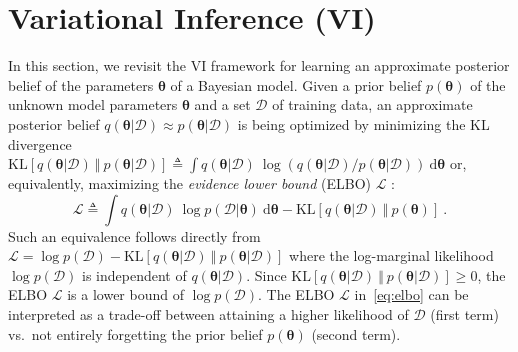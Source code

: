 \documentclass{article}
\theoremstyle{definition}
\newcommand{\todo}[1]{}
\newcommand{\mcl}[1]{\mathcal{#1}}
\newcommand{\da}{\mcl{D}}
\begin{document}
%
\todo{Question: are there a technique for doing unlearning for variational methods}
%
\todo{challenge: the approximate posterior. So to recover the exact unlearned model/posterior/belief is challenging}
%
\todo{a trade-off between unlearning and the predictive performance}
%
\todo{our contributions: upper bound for unlearning (easy for exact Bayesian learning but not interesting), when posterior is approximate, we present a modified likelihood that allows trade-off between unlearning quality and predictive performance}
%
\todo{quickly unlearning, and continue to optimize the posterior slowly}
%
\section{Variational Inference (VI)}
\label{sec:vi}%
%
In this section, we revisit the VI framework \cite{blei2017variational} for learning an approximate posterior belief of the parameters $\bm{\theta}$ of a Bayesian model. Given a prior belief $p(\bm{\theta})$ of the unknown model parameters $\bm{\theta}$ and a set $\da$ of training data, an approximate posterior belief $q(\bm{\theta}|\da) \approx p(\bm{\theta}|\da)$ is being optimized by minimizing the KL divergence $\text{KL}[q(\bm{\theta}|\da)\ \Vert\  p(\bm{\theta}|\da)] \triangleq \int q(\bm{\theta}|\da)\ \log (q(\bm{\theta}|\da) / p(\bm{\theta}|\da))\ \text{d}\bm{\theta}$ or, equivalently, maximizing the \emph{evidence lower bound} (ELBO) $\mcl{L}$ \cite{blei2017variational}:
%
\begin{equation}
\mcl{L} \triangleq \int q(\bm{\theta}|\da)\ \log p(\da | \bm{\theta})\ \text{d}\bm{\theta} - \text{KL}[q(\bm{\theta}|\da)\ \Vert\ p(\bm{\theta})]\ .
\label{eq:elbo}
\end{equation}
%
Such an equivalence follows directly from $\mcl{L}=\log p(\da) - \text{KL}[q(\bm{\theta}|\da)\ \Vert\  p(\bm{\theta}|\da)]$ where the log-marginal likelihood $\log p(\da)$ is independent of $q(\bm{\theta}|\da)$. Since $\text{KL}[q(\bm{\theta}|\da)\ \Vert\ p(\bm{\theta}|\da)] \ge 0$, the ELBO $\mcl{L}$ is a lower bound of $\log p(\da)$.
The ELBO $\mcl{L}$ in~\eqref{eq:elbo} can be interpreted as a trade-off between attaining a higher likelihood of $\da$ (first term) vs.~not entirely forgetting the prior belief $p(\bm{\theta})$ (second term).
\end{document}
